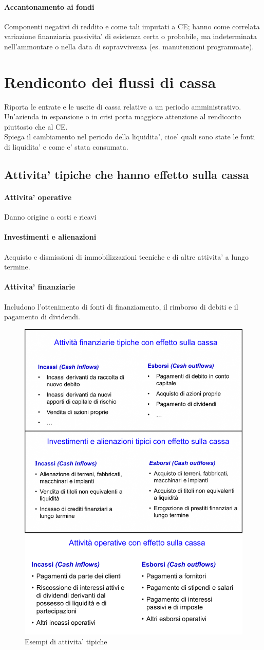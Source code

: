 \documentclass{report}
\begin{document}
	\paragraph{Accantonamento ai fondi} Componenti negativi di reddito e come tali imputati a CE; hanno come correlata variazione finanziaria passivita' di esistenza certa o probabile, ma indeterminata  nell'ammontare o nella data di sopravvivenza (es. manutenzioni programmate).
	\section{Rendiconto dei flussi di cassa}
	Riporta le entrate e le uscite di cassa relative a un periodo amministrativo. Un'azienda in espansione o in crisi porta maggiore attenzione al rendiconto piuttosto che al CE.
	\medskip \\Spiega il cambiamento nel periodo della liquidita', cioe' quali sono state le fonti di liquidita' e come e' stata consumata.
	\subsection{Attivita' tipiche che hanno effetto sulla cassa}
	\paragraph{Attivita' operative} Danno origine a costi e ricavi
	\paragraph{Investimenti e alienazioni} Acquisto e dismissioni di immobilizzazioni tecniche e di altre attivita' a lungo termine.
	\paragraph{Attivita' finanziarie} Includono l'ottenimento di fonti di finanziamento, il rimborso di debiti e il pagamento di dividendi.
	\begin{figure}[H]
		\centering
		\includegraphics[width=0.55\linewidth]{image-2}
		\caption{Esempi di attivita' tipiche}
		\label{fig:image-2}
	\end{figure}
\end{document}
